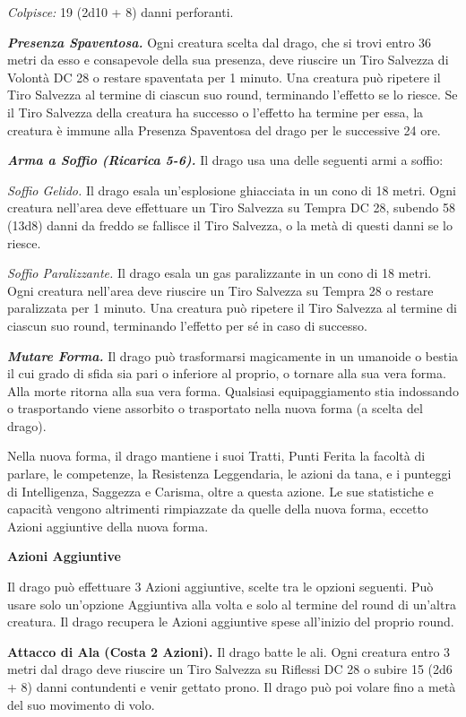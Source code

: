 \begin{multicols}{2}
{\emph{Colpisce:} 19 (2d10 + 8) danni perforanti.

\emph{\textbf{Presenza Spaventosa.}} Ogni creatura scelta dal drago, che si trovi entro 36 metri da esso e consapevole della sua presenza, deve riuscire un Tiro Salvezza di Volontà DC 28 o restare spaventata per 1 minuto. Una creatura può ripetere il Tiro Salvezza al termine di ciascun suo round, terminando l'effetto se lo riesce. Se il Tiro Salvezza della creatura ha successo o l'effetto ha termine per essa, la creatura è immune alla Presenza Spaventosa del drago per le successive 24 ore.

\emph{\textbf{Arma a Soffio (Ricarica 5-6).}} Il drago usa una delle seguenti armi a soffio:

\emph{Soffio Gelido.} Il drago esala un'esplosione ghiacciata in un cono di 18 metri. Ogni creatura nell'area deve effettuare un Tiro Salvezza su Tempra DC 28, subendo 58 (13d8) danni da freddo se fallisce il Tiro Salvezza, o la metà di questi danni se lo riesce.

\emph{Soffio Paralizzante.} Il drago esala un gas paralizzante in un cono di 18 metri. Ogni creatura nell'area deve riuscire un Tiro Salvezza su Tempra 28 o restare paralizzata per 1 minuto. Una creatura può ripetere il Tiro Salvezza al termine di ciascun suo round, terminando l'effetto per sé in caso di successo.

\emph{\textbf{Mutare Forma.}} Il drago può trasformarsi magicamente in un umanoide o bestia il cui grado di sfida sia pari o inferiore al proprio, o tornare alla sua vera forma. Alla morte ritorna alla sua vera forma. Qualsiasi equipaggiamento stia indossando o trasportando viene assorbito o trasportato nella nuova forma (a scelta del drago).

Nella nuova forma, il drago mantiene i suoi Tratti, Punti Ferita la facoltà di parlare, le competenze, la Resistenza Leggendaria, le azioni da tana, e i punteggi di Intelligenza, Saggezza e Carisma, oltre a questa azione. Le sue statistiche e capacità vengono altrimenti rimpiazzate da quelle della nuova forma, eccetto Azioni aggiuntive della nuova forma.

\textbf{Azioni Aggiuntive}

Il drago può effettuare 3 Azioni aggiuntive, scelte tra le opzioni seguenti. Può usare solo un'opzione Aggiuntiva alla volta e solo al termine del round di un'altra creatura. Il drago recupera le Azioni aggiuntive spese all'inizio del proprio round.

\textbf{Attacco di Ala (Costa 2 Azioni).} Il drago batte le ali. Ogni creatura entro 3 metri dal drago deve riuscire un Tiro Salvezza su Riflessi DC 28 o subire 15 (2d6 + 8) danni contundenti e venir gettato prono. Il drago può poi volare fino a metà del suo movimento di volo.

}
\end{multicols}
